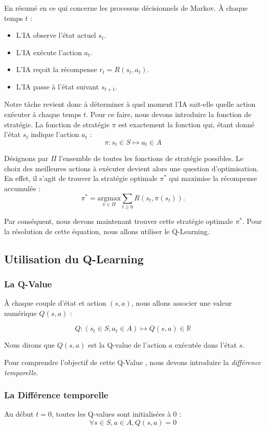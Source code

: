 \documentclass{article}
\begin{document}
En résumé en ce qui concerne les processus décisionnels de Markov. À chaque temps $t$ :
\begin{itemize}
    \item L'IA observe l'état actuel $s_t$.
    \item L'IA exécute l'action $a_t$.
    \item L'IA reçoit la récompense $r_t = R(s_t, a_t)$.
    \item L'IA passe à l'état suivant $s_{t+1}$.
\end{itemize}

Notre tâche revient donc à déterminer à quel moment l'IA sait-elle quelle action exécuter à chaque temps $t$. Pour ce faire, nous devons introduire la fonction de stratégie. La fonction de stratégie $\pi$ est exactement la fonction qui, étant donné l'état $s_t$ indique l'action $a_t$ :
$$\pi: s_t \in S \longmapsto a_t \in A$$

Désignons par $\Pi$ l'ensemble de toutes les fonctions de stratégie possibles. Le choix des meilleures actions à exécuter devient alors une question d'optimisation. En effet, il s'agit de trouver la stratégie optimale $\pi^*$ qui maximise la récompense accumulée :
$$\pi^* = \underset{\pi \in \Pi}{\mathrm{argmax}} \sum_{t \geq 0} R(s_t, \pi(s_t)).$$

Par conséquent, nous devons maintenant trouver cette stratégie optimale $\pi^*$. Pour la résolution de cette équation, nous allons utiliser le Q-Learning.

\subsection{Utilisation du Q-Learning}
\subsubsection{La Q-Value}
À chaque couple d'état et action $(s, a)$, nous allons associer une valeur numérique $Q(s, a)$ :

$$Q: (s_t \in S, a_t \in A) \longmapsto Q(s, a) \in \mathbb{R}$$

Nous dirons que $Q(s, a)$ est \og la Q-value de l'action $a$ exécutée dans l'état $s$\fg.

Pour comprendre l'objectif de cette \og Q-Value \fg, nous devons introduire la \emph{différence temporelle}.

\subsubsection{La Différence temporelle}
Au début $t = 0$, toutes les Q-values sont initialisées à $0$ :
\[
\forall s \in S, a \in A, Q(s, a) = 0
\]
\end{document}
